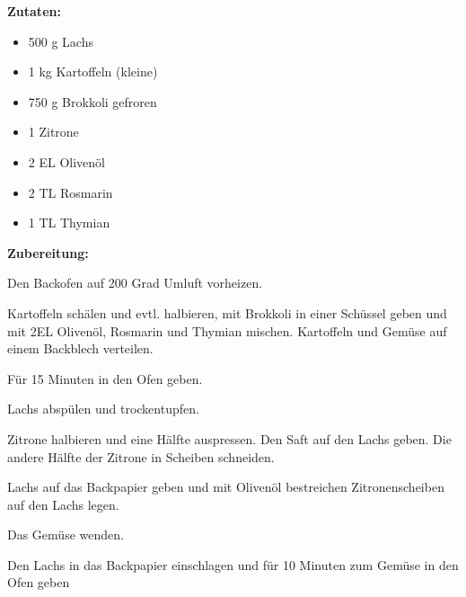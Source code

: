 \textbf {Zutaten:} \\
\begin{itemize}
	\item 500 g Lachs
	\item 1 kg Kartoffeln (kleine)
	\item 750 g Brokkoli gefroren
	\item 1 Zitrone
	\item 2 EL Olivenöl
	\item 2 TL Rosmarin
	\item 1 TL Thymian
\end{itemize}

\vspace* {1cm}

\textbf {Zubereitung:} \\
\begin{compactenum}
	\item Den Backofen auf 200 Grad Umluft vorheizen.
	\item Kartoffeln schälen und evtl. halbieren,
	mit Brokkoli in einer Schüssel geben und mit 2EL Olivenöl, Rosmarin und Thymian mischen.
	Kartoffeln und Gemüse auf einem Backblech verteilen.
	\item Für 15 Minuten in den Ofen geben.
	\item Lachs abspülen und trockentupfen.
	\item Zitrone halbieren und eine Hälfte auspressen. 
	Den Saft auf den Lachs geben.
	Die andere Hälfte der Zitrone in Scheiben schneiden.
	\item Lachs auf das Backpapier geben und mit Olivenöl bestreichen
	Zitronenscheiben auf den Lachs legen.
	\item Das Gemüse wenden. 
	\item Den Lachs in das Backpapier einschlagen und für 10 Minuten zum Gemüse in den Ofen geben 
\end{compactenum}


